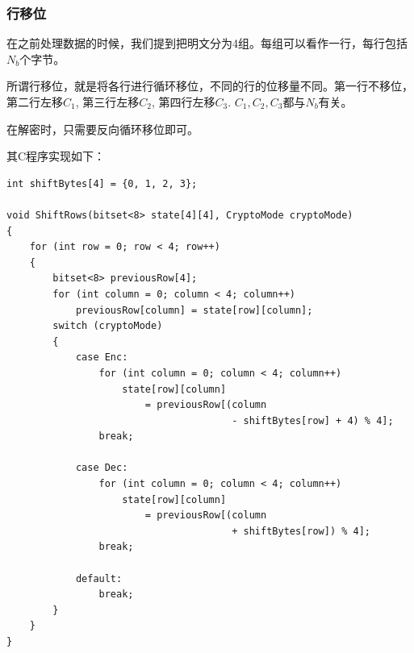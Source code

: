 \subsubsection{行移位}
在之前处理数据的时候，我们提到把明文分为4组。每组可以看作一行，每行包括$N_b$个字节。\par
所谓行移位，就是将各行进行循环移位，不同的行的位移量不同。第一行不移位，第二行左移$C_1$, 第三行左移$C_2$, 第四行左移$C_3$. $C_1, C_2, C_3$都与$N_b$有关。\par
在解密时，只需要反向循环移位即可。\par
其C程序实现如下：
\begin{prove}
\begin{verbatim}
int shiftBytes[4] = {0, 1, 2, 3};

void ShiftRows(bitset<8> state[4][4], CryptoMode cryptoMode)
{
    for (int row = 0; row < 4; row++)
    {
        bitset<8> previousRow[4];
        for (int column = 0; column < 4; column++)
            previousRow[column] = state[row][column];
        switch (cryptoMode)
        {
            case Enc:
                for (int column = 0; column < 4; column++)
                    state[row][column]
                        = previousRow[(column
                                       - shiftBytes[row] + 4) % 4];
                break;
                
            case Dec:
                for (int column = 0; column < 4; column++)
                    state[row][column]
                        = previousRow[(column
                                       + shiftBytes[row]) % 4];
                break;
                
            default:
                break;
        }
    }
}
\end{verbatim}
\end{prove}
